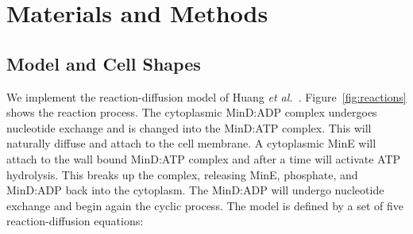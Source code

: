 \documentclass[10pt,letterpaper]{article}
\begin{document}
\section*{Materials and Methods}
\subsection*{Model and Cell Shapes}
\label{sec:model-method-shapes}
We implement the reaction-diffusion model of Huang \emph{et
  al.}~\cite{huang2003dynamic}.  Figure~\ref{fig:reactions} shows the
reaction process.  The cytoplasmic MinD:ADP complex undergoes
nucleotide exchange and is changed into the MinD:ATP complex.  This
will naturally diffuse and attach to the cell membrane.  A cytoplasmic
MinE will attach to the wall bound MinD:ATP complex and after a time
will activate ATP hydrolysis.  This breaks up the complex, releasing
MinE, phosphate, and MinD:ADP back into the cytoplasm.  The MinD:ADP
will undergo nucleotide exchange and begin again the cyclic process.
The model is defined by a set of five reaction-diffusion equations:
\end{document}
